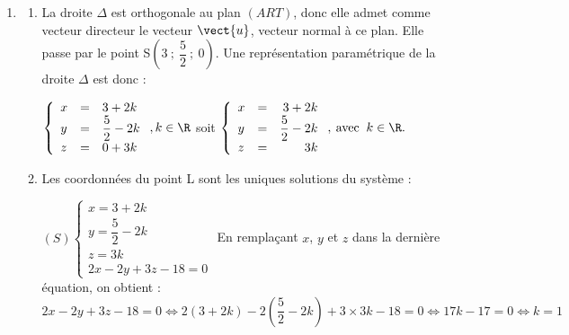 \begin{enumerate}
\begin{enumerate}
		$\vect{n}.\vect{AR}=2\times 0+(-2)\times 3+3\times 2=-6+6=0$ et $\vect{n}.\vect{AT}=2\times(-3)+(-2)\times 0+3\times 2=-6+6=0$.
		
		Donc $\vect{n}\perp\vect{AR}$ et $\vect{n}\perp\vect{AT}$ donc $\vect{n}$ est normal à tout vecteur du plan $(ART)$, donc $\vect{n}$ est un vecteur normal au plan $(ART)$.
		\item Le plan $(ART)$ a pour équation cartésienne : $ax+by+cz+d = 0$, où $(a~;~b~;~c)$ sont les cordonnées d'un vecteur normal au plan. En prenant comme vecteur normal le vecteur $\vect{n}$, on obtient : $(ART)$ : $2x - 2y + 3z + d = 0$. 
				
Or $A\in \text{(ART)}$ donc $12-0+6+d=0$ donc $d=-18$.

Donc le plan $(ART)$ a pour équation $2x - 2y + 3z - 18 = 0$.
	\end{enumerate}
	\item 
	\begin{enumerate}
		\item La droite $\Delta$ est orthogonale au plan $(ART)$, donc elle admet comme vecteur directeur le vecteur $\vect{u}$, vecteur normal à ce plan. Elle passe par le point S$\left(3~;~\dfrac52~;~0\right)$. Une représentation paramétrique de la droite $\Delta$ est donc : 

		$\left\{\begin{array}{l c l}	x&=&3+2k\\y &=&\dfrac52-2k\\z&=&0+3k			\end{array}\right. , k \in \R$ soit 
		$\left\{\begin{array}{l c r}x&=&3+2k\\y&=& \dfrac52 - 2k\\z &=& 3k \end{array}\right.,\: \text{avec }\:k \in \R.$
		\item Les coordonnées du point L sont les uniques solutions du système :
		
$(S) \left\{\begin{array}{l}	x = 3 + 2k\\y =\dfrac52-2k\\z=3k\\2x - 2y + 3z - 18=0			\end{array}\right.$
		En remplaçant $x$, $y$ et $z$ dans la dernière équation, on obtient : 
$2x - 2y + 3z - 18=0 \iff 2(3+2k)-2\left(\dfrac52-2k\right)+3\times 3k-18=0 \iff 17k-17=0 \iff k=1$
		

\end{enumerate}
\end{enumerate}
